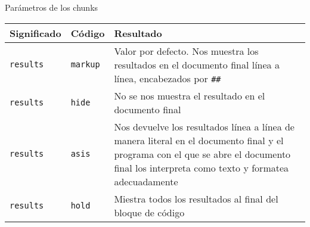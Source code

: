 \documentclass[
  ignorenonframetext,
]{beamer}
\begin{document}
\begin{frame}[fragile]{Parámetros de los chunks}
\protect\hypertarget{paruxe1metros-de-los-chunks-1}{}

\begin{longtable}[]{@{}lll@{}}
\toprule
\begin{minipage}[b]{0.30\columnwidth}\raggedright
Significado\strut
\end{minipage} & \begin{minipage}[b]{0.30\columnwidth}\raggedright
Código\strut
\end{minipage} & \begin{minipage}[b]{0.30\columnwidth}\raggedright
Resultado\strut
\end{minipage}\tabularnewline
\midrule
\endhead
\begin{minipage}[t]{0.30\columnwidth}\raggedright
\texttt{results}\strut
\end{minipage} & \begin{minipage}[t]{0.30\columnwidth}\raggedright
\texttt{markup}\strut
\end{minipage} & \begin{minipage}[t]{0.30\columnwidth}\raggedright
Valor por defecto. Nos muestra los resultados en el documento final
línea a línea, encabezados por \texttt{\#\#}\strut
\end{minipage}\tabularnewline
\begin{minipage}[t]{0.30\columnwidth}\raggedright
\texttt{results}\strut
\end{minipage} & \begin{minipage}[t]{0.30\columnwidth}\raggedright
\texttt{hide}\strut
\end{minipage} & \begin{minipage}[t]{0.30\columnwidth}\raggedright
No se nos muestra el resultado en el documento final\strut
\end{minipage}\tabularnewline
\begin{minipage}[t]{0.30\columnwidth}\raggedright
\texttt{results}\strut
\end{minipage} & \begin{minipage}[t]{0.30\columnwidth}\raggedright
\texttt{asis}\strut
\end{minipage} & \begin{minipage}[t]{0.30\columnwidth}\raggedright
Nos devuelve los resultados línea a línea de manera literal en el
documento final y el programa con el que se abre el documento final los
interpreta como texto y formatea adecuadamente\strut
\end{minipage}\tabularnewline
\begin{minipage}[t]{0.30\columnwidth}\raggedright
\texttt{results}\strut
\end{minipage} & \begin{minipage}[t]{0.30\columnwidth}\raggedright
\texttt{hold}\strut
\end{minipage} & \begin{minipage}[t]{0.30\columnwidth}\raggedright
Miestra todos los resultados al final del bloque de código\strut
\end{minipage}\tabularnewline
\bottomrule
\end{longtable}


\end{frame}
\end{document}
